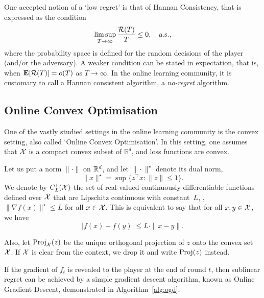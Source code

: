 One accepted notion of a `low regret' is that of Hannan Consistency, that is expressed as the condition
\[
    \limsup_{T\to\infty} \frac{\mathcal{R}(T)}{T} \leq 0, \quad \text{a.s.},
\]
where the probability space is defined for the random decisions of the player (and/or the adversary). A weaker condition can be stated in expectation, that is, when $\mathbf{E}[\mathcal{R}(T)] = o(T)$ as $T\to\infty$. In the online learning community, it is customary to call a Hannan consistent algorithm, a \emph{no-regret} algorithm.

\subsection{Online Convex Optimisation}
One of the vastly studied settings in the online learning community is the convex setting, also called `Online Convex Optimisation'. In this setting, one assumes that $\mathcal{X}$ is a compact convex subset of $\mathbb{R}^d$, and loss functions are convex. 

Let us put a norm $\|\cdot\|$ on $\mathbb{R}^d$, and let $\|\cdot\|^\star$ denote its dual norm, \ie
\[
    \|x\|^\star = \sup \{ z^\top x : \|z\| \leq 1 \}.
\]
We denote by $C^1_{L}(\mathcal{X})$ the set of real-valued continuously differentiable functions defined over $\mathcal{X}$ that are Lipschitz continuous with constant~$L$, \ie, $\|\nabla f(x)\|^\star \leq L$ for all $x\in \mathcal{X}$. This is equivalent to say that for all $x, y\in \mathcal{X}$, we have
\[
    |f(x) - f(y)| \leq L\cdot\|x-y\|.
\]


Also, let $\operatorname{Proj}_{\mathcal{X}}(z)$ be the unique orthogonal projection of $z$ onto the convex set $\mathcal{X}$. If $\mathcal{X}$ is clear from the context, we drop it and write $\operatorname{Proj}(z)$ instead.

If the gradient of $f_t$ is revealed to the player at the end of round $t$, then sublinear regret can be achieved by a simple gradient descent algorithm, known as Online Gradient Descent, demonstrated in Algorithm~\ref{alg:ogd}. 

